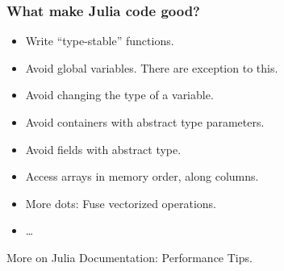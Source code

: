 \documentclass[10pt,t]{beamer}
\begin{document}
\begin{frame}
  \frametitle{What make Julia code good?}


  \begin{itemize}
    \RaggedRight

  \item Write ``\alert{type-stable}'' functions.

  \item Avoid global variables. There are exception to this.

  \item Avoid changing the type of a variable.

  \item Avoid containers with abstract type parameters.

  \item Avoid fields with abstract type.

  \item Access arrays in memory order, along columns.

  \item More dots: Fuse vectorized operations.

  \item \ldots

  \end{itemize}


  More on
  {Julia Documentation: Performance Tips}.

\end{frame}
\end{document}
